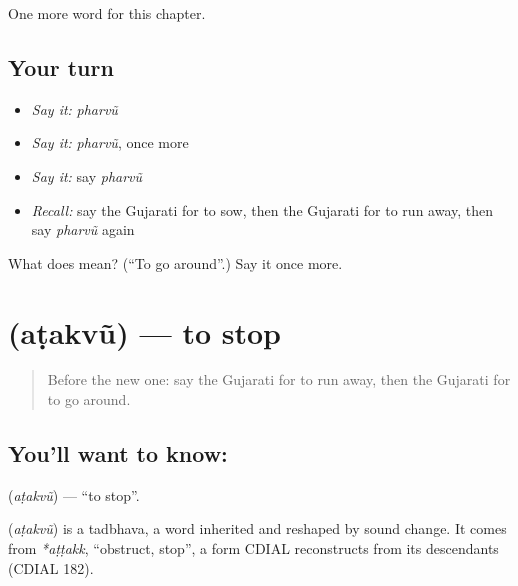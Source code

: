 \begin{grammarlens}[title={What you've built}]
One more word for this chapter.
\end{grammarlens}

\subsection*{Your turn}
\begin{itemize}
\raggedright
  \item \emph{Say it:} \emph{pharvũ}
  \item \emph{Say it:} \emph{pharvũ}, once more
  \item \emph{Say it:} say \emph{pharvũ}
  \item \emph{Recall:} say the Gujarati for to sow, then the Gujarati for to run away, then say \emph{pharvũ} again
\end{itemize}

\begin{tcolorbox}[breakable,colback=teal!4,colframe=teal!35!black,title={Before you move on}]
What does  mean? (\textquotedblleft{}To go around\textquotedblright{}.) Say it once more.
\end{tcolorbox}
\section[\texorpdfstring{\gu{અટકવું} (aṭakvũ)}{અટકવું (aṭakvũ)}]{ (aṭakvũ) — to stop}

\label{lesson:GU-C143-atakvu}



\begin{quote}
Before the new one: say the Gujarati for to run away, then the Gujarati for to go around.
\end{quote}

\subsection*{You'll want to know: }
\textbf{} (\emph{aṭakvũ}) — \textquotedblleft{}to stop\textquotedblright{}.

\begin{cousinweb}
\textbf{} (\emph{aṭakvũ}) is a tadbhava, a word inherited and reshaped by sound change. It comes from \emph{*aṭṭakk}, \textquotedblleft{}obstruct, stop\textquotedblright{}, a form CDIAL reconstructs from its descendants (CDIAL 182).
\end{cousinweb}

